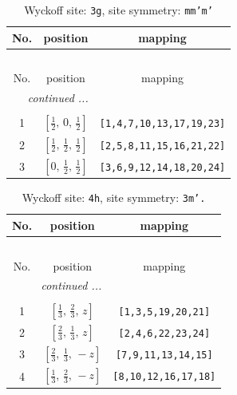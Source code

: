 \documentclass[fleqn,8pt]{jsarticle}
\begin{document}
\begin{longtable}{ccc}
\caption{Wyckoff site: {\tt 3g}, site symmetry: {\tt mm'm'}}
 \\
 \hline \hline
No. & position & mapping \\ \hline \endfirsthead

\multicolumn{2}{l}{\tablename\ \thetable{}} \\
 \hline \hline
No. & position & mapping \\ \hline \endhead

 \hline \hline
\multicolumn{2}{r}{\footnotesize\it continued ...} \\ \endfoot

 \hline \hline
\multicolumn{2}{r}{} \\ \endlastfoot

1 & $\left[ \frac{1}{2},\, 0,\, \frac{1}{2} \right]$ & {\tt [1,4,7,10,13,17,19,23]} \\ \hline
2 & $\left[ \frac{1}{2},\, \frac{1}{2},\, \frac{1}{2} \right]$ & {\tt [2,5,8,11,15,16,21,22]} \\ \hline
3 & $\left[ 0,\, \frac{1}{2},\, \frac{1}{2} \right]$ & {\tt [3,6,9,12,14,18,20,24]} \\
\end{longtable}
\renewcommand{\arraystretch}{1.2}
\begin{longtable}{ccc}
\caption{Wyckoff site: {\tt 4h}, site symmetry: {\tt 3m'.}}
 \\
 \hline \hline
No. & position & mapping \\ \hline \endfirsthead

\multicolumn{2}{l}{\tablename\ \thetable{}} \\
 \hline \hline
No. & position & mapping \\ \hline \endhead

 \hline \hline
\multicolumn{2}{r}{\footnotesize\it continued ...} \\ \endfoot

 \hline \hline
\multicolumn{2}{r}{} \\ \endlastfoot

1 & $\left[ \frac{1}{3},\, \frac{2}{3},\, z \right]$ & {\tt [1,3,5,19,20,21]} \\ \hline
2 & $\left[ \frac{2}{3},\, \frac{1}{3},\, z \right]$ & {\tt [2,4,6,22,23,24]} \\ \hline
3 & $\left[ \frac{2}{3},\, \frac{1}{3},\, - z \right]$ & {\tt [7,9,11,13,14,15]} \\ \hline
4 & $\left[ \frac{1}{3},\, \frac{2}{3},\, - z \right]$ & {\tt [8,10,12,16,17,18]} \\
\end{longtable}
\end{document}
